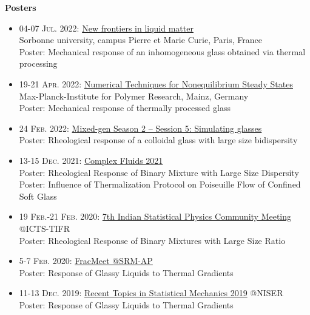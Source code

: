 {\bf {\large Posters}}
\begin{small}
\begin{itemize}

\item \textsc{04-07 Jul. 2022: } \href{https://www.cecam.org/workshop-details/1111}{New frontiers in liquid matter}\\ 
Sorbonne university, campus Pierre et Marie Curie, Paris, France\\
\footnotesize{Poster: Mechanical response of an inhomogeneous glass obtained via thermal processing}

\item \textsc{19-21 Apr. 2022: } \href{https://www.cecam.org/workshop-details/36}{Numerical Techniques for Nonequilibrium Steady States}\\ 
Max-Planck-Institute for Polymer Research, Mainz, Germany\\
\footnotesize{Poster: Mechanical response of thermally processed glass}

\item \textsc{24 Feb. 2022: } \href{https://www.cecam.org/workshop-details/1105}{Mixed-gen Season 2 – Session 5: Simulating glasses}\\
\footnotesize{Poster: Rheological response of a colloidal glass with large size bidispersity}

\item \textsc{13-15 Dec. 2021: } \href{https://compflu2021.in}{Complex Fluids 2021}\\
\footnotesize{Poster: Rheological Response of Binary Mixture with Large Size Dispersity}\\
\footnotesize{Poster: Influence of Thermalization Protocol on Poiseuille Flow of Confined Soft Glass}

\item \textsc{19 Feb.-21 Feb. 2020: } \href{https://www.icts.res.in/discussion-meeting/ispcm2020}{7th Indian Statistical Physics Community Meeting} @ICTS-TIFR\\
\footnotesize{Poster: Rheological Response of Binary Mixtures with Large Size Ratio}

\item \textsc{5-7 Feb. 2020: }  \href{https://srmap.edu.in/accms-2020/symposium-fracmeet-2020/}{FracMeet @SRM-AP}\\
\footnotesize{Poster: Response of Glassy Liquids to Thermal Gradients}

\item \textsc{11-13 Dec. 2019: } {\href{https://www.niser.ac.in/RTSM/}{Recent Topics in Statistical Mechanics 2019}} @NISER\\
\footnotesize{Poster: Response of Glassy Liquids to Thermal Gradients}


\end{itemize}
\end{small}
